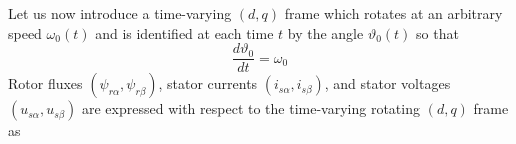 \documentclass[12pt,a4paper]{scrartcl}
\begin{document}
\begin{onehalfspace}
Let us now introduce a time-varying $\left(d,q\right)$ frame which rotates at an arbitrary speed $\omega_0(t)$ and is identified at each time $t$ by the angle $\vartheta_0(t)$ so that
\begin{equation}\label{eq54}
	\frac{d\vartheta_0}{dt} = \omega_0
\end{equation}
Rotor fluxes $(\psi_{r\alpha}, \psi_{r\beta})$, stator currents $(i_{s\alpha}, i_{s\beta})$, and stator voltages $(u_{s\alpha}, u_{s\beta})$ are expressed with respect to the time-varying rotating $(d,q)$ frame as 
\begin{flalign}\label{eq55}
		\left[
		\begin{matrix}
			\psi_{rd} \\[6pt]
			\psi_{rq}
		\end{matrix}
		\right] & =
		\left[
		\begin{matrix}
			\cos\vartheta_0 & \sin\vartheta_0 \\[6pt]
			-\sin\vartheta_0 & \cos\vartheta_0 \\[6pt]
		\end{matrix}
		\right]
		\left[
		\begin{matrix}
			\psi_{r\alpha} \\[6pt]
			\psi_{r\beta}
		\end{matrix}
		\right] \\[6pt]
		\left[
		\begin{matrix}
			i_{sd} \\[6pt]
			i_{sq}
		\end{matrix}
		\right] & =
		\left[
		\begin{matrix}
			\cos\vartheta_0 & \sin\vartheta_0 \\[6pt]
			-\sin\vartheta_0 & \cos\vartheta_0 \\[6pt]
		\end{matrix}
		\right]
		\left[
		\begin{matrix}
			i_{s\alpha} \\[6pt]
			i_{s\beta}
		\end{matrix}
		\right] \\[6pt]
		\left[
		\begin{matrix}
			u_{sd} \\[6pt]
			u_{sq}
		\end{matrix} 
		\right] & = 
		\left[
		\begin{matrix}
			\cos\vartheta_0 & \sin\vartheta_0 \\[6pt]
			-\sin\vartheta_0 & \cos\vartheta_0 \\[6pt]

\end{matrix}
\end{flalign}
\end{onehalfspace}
\end{document}

